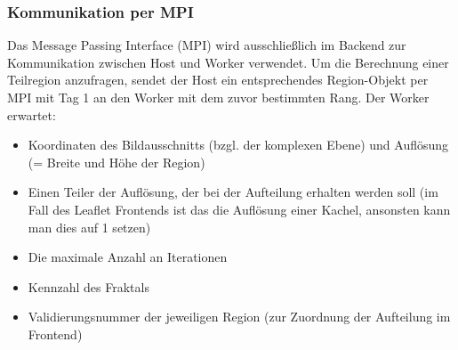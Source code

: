 \subsubsection{Kommunikation per MPI}

Das Message Passing Interface (MPI) wird ausschließlich im Backend zur Kommunikation zwischen Host
und Worker verwendet.
Um die Berechnung einer Teilregion anzufragen, sendet der Host ein entsprechendes Region-Objekt per
MPI mit Tag 1 an den Worker mit dem zuvor bestimmten Rang. Der Worker erwartet:
\begin{itemize}
    \item Koordinaten des Bildausschnitts (bzgl. der komplexen Ebene) und Auflösung (= Breite und Höhe
der Region)
    \item Einen Teiler der Auflösung, der bei der Aufteilung erhalten werden soll (im Fall des Leaflet
Frontends ist das die Auflösung einer Kachel, ansonsten kann man dies auf 1 setzen)
    \item Die maximale Anzahl an Iterationen
    \item Kennzahl des Fraktals
    \item Validierungsnummer der jeweiligen Region (zur Zuordnung der Aufteilung im Frontend)
\end{itemize}

